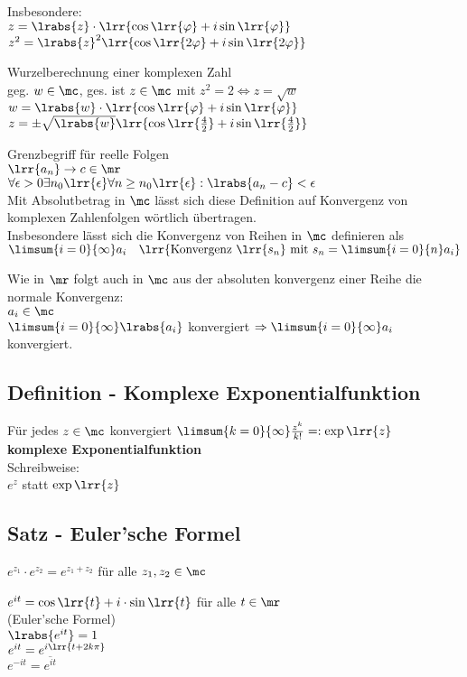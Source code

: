 			Insbesondere:\\
			$z=\lrabs{z}\cdot\lrr{\cos\lrr{\varphi}+i\sin\lrr{\varphi}}$\\
			$z^2=\lrabs{z}^2\lrr{\cos\lrr{2\varphi}+i\sin\lrr{2\varphi}}$
		\item Wurzelberechnung einer komplexen Zahl\\
			geg. $w\in\mc$, ges. ist $z\in\mc$ mit $z^2=2\Leftrightarrow z=\sqrt{w}$\\
			$w=\lrabs{w}\cdot\lrr{\cos\lrr{\varphi}+i\sin\lrr{\varphi}}$\\
			$z=\pm\sqrt{\lrabs{w}}\lrr{\cos\lrr{\frac{4}{2}}+i\sin\lrr{\frac{4}{2}}}$

			Grenzbegriff für reelle Folgen\\
			$\lrr{a_n}\rightarrow c\in\mr$\\
			$\forall\epsilon >0\exists n_0\lrr{\epsilon}\forall n\geq n_0\lrr{\epsilon}:\lrabs{a_n-c}<\epsilon$\\
			Mit Absolutbetrag in $\mc$ lässt sich diese Definition auf Konvergenz von komplexen Zahlenfolgen wörtlich übertragen.\\
			Insbesondere lässt sich die Konvergenz von Reihen in $\mc$ definieren als\\
			$\limsum{i=0}{\infty}a_i\quad\lrr{\mbox{Konvergenz } \lrr{s_n} \mbox{ mit } s_n=\limsum{i=0}{n}a_i}$

			Wie in $\mr$ folgt auch in $\mc$ aus der absoluten konvergenz einer Reihe die normale Konvergenz:\\
			$a_i\in\mc$\\
			$\limsum{i=0}{\infty}\lrabs{a_i}$ konvergiert $\Rightarrow \limsum{i=0}{\infty}a_i$ konvergiert.
	\subExEnd

\subsection{Definition - Komplexe Exponentialfunktion}
	Für jedes $z\in\mc$ konvergiert $\limsum{k=0}{\infty}\frac{z^k}{k!}=:\exp\lrr{z}$\\
	\textbf{komplexe Exponentialfunktion}\\
	Schreibweise:\\
	$e^z$ statt $\exp\lrr{z}$

\subsection{Satz - Euler'sche Formel}
		\item $e^{z_1}\cdot e^{z_2}=e^{z_1+z_2}$ für alle $z_1,z_2\in\mc$
		\item $e^{it}=\cos\lrr{t}+i\cdot\sin\lrr{t}$ für alle $t\in\mr$\\
			(Euler'sche Formel)\\
			$\lrabs{e^{it}}=1$\\
			$e^{it}=e^{i\lrr{t+2k\pi}}$\\
			$e^{-it}=\overline{e^{it}}$

